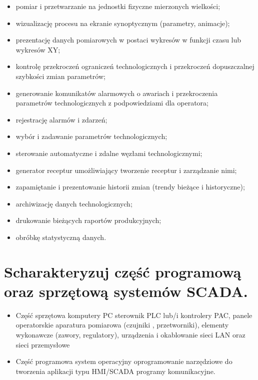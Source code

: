 \documentclass{article}
\begin{document}
	\begin{itemize}
	
	\item pomiar i przetwarzanie na jednostki fizyczne mierzonych wielkości;
	\item wizualizację procesu na ekranie synoptycznym (parametry, animacje);
	\item prezentację danych pomiarowych w postaci wykresów w funkcji czasu lub
	wykresów XY;
	\item kontrolę przekroczeń ograniczeń technologicznych i przekroczeń dopuszczalnej
	szybkości zmian parametrów;
	\item generowanie komunikatów alarmowych o awariach i przekroczenia parametrów
	technologicznych z podpowiedziami dla operatora;
	\item rejestrację alarmów i zdarzeń;
	\item wybór i zadawanie parametrów technologicznych;
	\item sterowanie automatyczne i zdalne węzłami technologicznymi;
	\item generator receptur umożliwiający tworzenie receptur i zarządzanie nimi;
	\item zapamiętanie i prezentowanie historii zmian (trendy bieżące i historyczne);
	\item archiwizację danych technologicznych;
	\item drukowanie bieżących raportów produkcyjnych;
	\item obróbkę statystyczną danych.
\end{itemize}
	
	
	
	
	\section{Scharakteryzuj część programową oraz sprzętową systemów SCADA.}
	\begin{itemize}
		\item Część sprzętowa
		  \subitem komputery PC
		  \subitem sterownik PLC lub/i kontrolery PAC,
		  \subitem panele operatorskie
		  \subitem aparatura pomiarowa (czujniki , przetworniki),
		  \subitem elementy wykonawcze (zawory, regulatory),
		  \subitem  urządzenia i okablowanie
		  \subitem sieci LAN oraz sieci przemysłowe		  
	    \item Część programowa
		  \subitem system operacyjny
		  \subitem oprogramowanie
		  \subitem narzędziowe do tworzenia aplikacji typu HMI/SCADA
		  \subitem programy komunikacyjne.		  
		\end{itemize}
	
\end{document}
